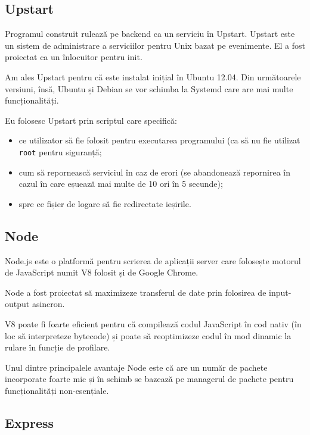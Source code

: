 \documentclass[a4wide,12pt]{report}
\newcommand{\eng}[1]{{#1}} %
\newcommand{\cod}[1]{\texttt{#1}}
\newcommand{\acr}[1]{{\textsmaller[1]{\textsc{#1}}}} %
\begin{document}
\subsection{Upstart}

Programul construit rulează pe \eng{backend} ca un serviciu în Upstart. Upstart
este un sistem de administrare a serviciilor pentru Unix bazat pe evenimente. El
a fost proiectat ca un înlocuitor pentru init.

Am ales Upstart pentru că este instalat inițial în Ubuntu 12.04. Din următoarele
versiuni, însă, Ubuntu și Debian se vor schimba la Systemd care are mai multe
funcționalități.

Eu folosesc Upstart prin scriptul care specifică:

\begin{itemize}

\item ce utilizator să fie folosit pentru executarea programului (ca să nu fie
utilizat \cod{root} pentru siguranță;

\item cum să repornească serviciul în caz de erori (se abandonează repornirea în
cazul în care eșuează mai multe de 10 ori în 5 secunde);

\item spre ce fișier de logare să fie redirectate ieșirile.

\end{itemize}

\subsection{Node}

Node.js\cite{nodejs} este o platformă pentru scrierea de aplicații server care
folosește motorul de JavaScript numit V8 folosit și de Google Chrome.

Node a fost proiectat să maximizeze transferul de date prin folosirea de
input-output asincron.

V8 poate fi foarte eficient pentru că compilează codul JavaScript în cod nativ
(în loc să interpreteze bytecode) și poate să reoptimizeze codul în mod dinamic
la rulare în funcție de profilare.\cite{vopt}

Unul dintre principalele avantaje Node este că are un număr de pachete incorporate
foarte mic și în schimb se bazează pe managerul de pachete \acr{NPM} pentru
funcționalități non-esențiale.

\subsection{Express}
\end{document}
